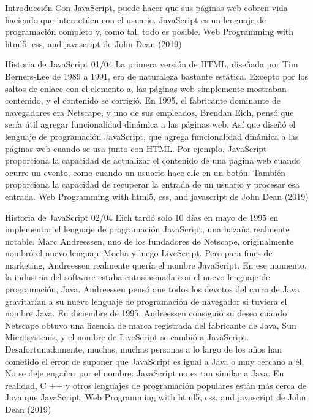 \begin{frame}{Introducción}
\justifying
Con JavaScript, puede hacer que sus páginas web cobren vida haciendo que interactúen con el usuario. JavaScript es un lenguaje de programación completo y, como tal, todo es posible. 
{\tiny Web Programming with html5, css, and javascript de John Dean (2019)}
\end{frame}

\begin{frame}{Historia de JavaScript 01/04}
\justifying
La primera versión de HTML, diseñada por Tim Berners-Lee de 1989 a 1991, era de naturaleza bastante estática.
Excepto por los saltos de enlace con el elemento a, las páginas web simplemente mostraban contenido, y el contenido se corrigió. En 1995, el fabricante dominante de navegadores era Netscape, y uno de sus empleados, Brendan Eich, pensó que sería útil agregar funcionalidad dinámica a las páginas web. Así que diseñó el lenguaje de programación JavaScript, que agrega funcionalidad dinámica a las páginas web cuando se usa junto con HTML. Por ejemplo, JavaScript proporciona la capacidad de actualizar el contenido de una página web cuando ocurre un evento, como cuando un usuario hace clic en un botón. También proporciona la capacidad de recuperar la entrada de un usuario y procesar esa entrada.
{\tiny Web Programming with html5, css, and javascript de John Dean (2019)}
\end{frame}

\begin{frame}{Historia de JavaScript 02/04}
\justifying
Eich tardó solo 10 días en mayo de 1995 en implementar el lenguaje de programación JavaScript, una hazaña realmente notable. Marc Andreessen, uno de los fundadores de Netscape, originalmente nombró el nuevo lenguaje Mocha y luego LiveScript. Pero para fines de marketing, Andreessen realmente quería el nombre JavaScript. En ese momento, la industria del software estaba entusiasmada con el nuevo lenguaje de programación, Java. Andreessen pensó que todos los devotos del carro de Java gravitarían a su nuevo lenguaje de programación de navegador si tuviera el nombre Java. En diciembre de 1995, Andreessen consiguió su deseo cuando Netscape obtuvo una licencia de marca registrada del fabricante de Java, Sun Microsystems, y el nombre de LiveScript se cambió a JavaScript. Desafortunadamente, muchas, muchas personas a lo largo de los años han cometido el error de suponer que JavaScript es igual a Java o muy cercano a él. No se deje engañar por el nombre: JavaScript no es tan similar a Java. En realidad, C ++ y otros lenguajes de programación populares están más cerca de Java que JavaScript.
{\tiny Web Programming with html5, css, and javascript de John Dean (2019)}
\end{frame}


